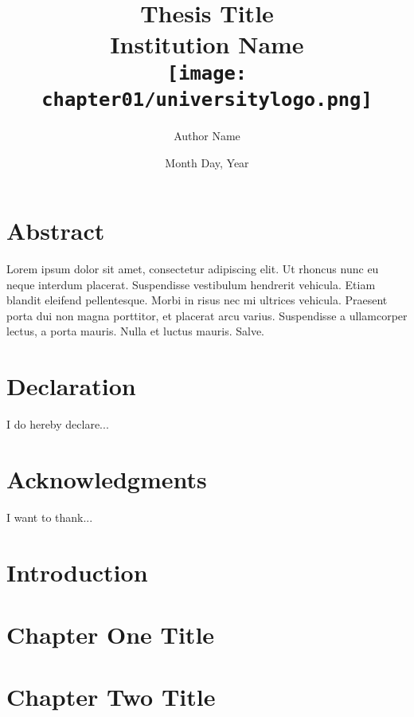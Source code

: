 





\title{
	{Thesis Title}\\
	{\large Institution Name}\\
	{\texttt{[image: chapter01/universitylogo.png]}}
}

\author{Author Name}
\date{Month Day, Year}



\maketitle
\chapter*{Abstract}
Lorem ipsum dolor sit amet, consectetur adipiscing elit. Ut rhoncus nunc eu neque interdum placerat. Suspendisse vestibulum hendrerit vehicula. Etiam blandit eleifend pellentesque. Morbi in risus nec mi ultrices vehicula. Praesent porta dui non magna porttitor, et placerat arcu varius. Suspendisse a ullamcorper lectus, a porta mauris. Nulla et luctus mauris. Salve.

\chapter*{Declaration}
I do hereby declare...

\chapter*{Acknowledgments}
I want to thank...

\tableofcontents

\chapter{Introduction}


\chapter{Chapter One Title}


\chapter{Chapter Two Title}

{}
